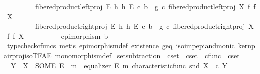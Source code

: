 \begin{isabellebody}
\ \ \ \ \ \ \ \ \ fibered{\isacharunderscore}{\kern0pt}product{\isacharunderscore}{\kern0pt}left{\isacharunderscore}{\kern0pt}proj\ E\ h\ h\ E\ {\isasymcirc}\isactrlsub c\ b\ {\isacharequal}{\kern0pt}\ g\ {\isasymcirc}\isactrlsub c\ fibered{\isacharunderscore}{\kern0pt}product{\isacharunderscore}{\kern0pt}left{\isacharunderscore}{\kern0pt}proj\ X\ f\ f\ X\ {\isasymand}\isanewline
\ \ \ \ \ \ \ \ \ fibered{\isacharunderscore}{\kern0pt}product{\isacharunderscore}{\kern0pt}right{\isacharunderscore}{\kern0pt}proj\ E\ h\ h\ E\ {\isasymcirc}\isactrlsub c\ b\ {\isacharequal}{\kern0pt}\ g\ {\isasymcirc}\isactrlsub c\ fibered{\isacharunderscore}{\kern0pt}product{\isacharunderscore}{\kern0pt}right{\isacharunderscore}{\kern0pt}proj\ X\ f\ f\ X\ {\isasymand}\isanewline
\ \ \ \ \ \ \ \ \ epimorphism\ b{\isachardoublequoteclose}\isanewline
\ \ \ \ \isamarkupfalse%
\ {\isacharparenleft}{\kern0pt}typecheck{\isacharunderscore}{\kern0pt}cfuncs{\isacharcomma}{\kern0pt}\ metis\ epimorphism{\isacharunderscore}{\kern0pt}def{}\ existence\ g{\isacharunderscore}{\kern0pt}eq\ iso{\isacharunderscore}{\kern0pt}imp{\isacharunderscore}{\kern0pt}epi{\isacharunderscore}{\kern0pt}and{\isacharunderscore}{\kern0pt}monic\ kern{\isacharunderscore}{\kern0pt}pair{\isacharunderscore}{\kern0pt}proj{\isacharunderscore}{\kern0pt}iso{\isacharunderscore}{\kern0pt}TFAE{}\ monomorphism{\isacharunderscore}{\kern0pt}def{}{\isacharparenright}{\kern0pt}\isanewline
{}\isamarkupfalse%
%
\endisatagproof
{\isafoldproof}%
%
\isadelimproof
%
\endisadelimproof
%
\isadelimdocument
%
\endisadelimdocument
%
\isatagdocument
%
\isamarkuptrue%
%
\endisatagdocument
{\isafolddocument}%
%
\isadelimdocument
%
\endisadelimdocument
{}\isamarkupfalse%
\ set{\isacharunderscore}{\kern0pt}subtraction\ {\isacharcolon}{\kern0pt}{\isacharcolon}{\kern0pt}\ {\isachardoublequoteopen}cset\ {\isasymRightarrow}\ cset\ {\isasymtimes}\ cfunc\ {\isasymRightarrow}\ cset{\isachardoublequoteclose}\ {\isacharparenleft}{\kern0pt}\ {\isachardoublequoteopen}{\isasymsetminus}{\isachardoublequoteclose}\ {}{}{\isacharparenright}{\kern0pt}\ \isanewline
\ \ {\isachardoublequoteopen}Y\ {\isasymsetminus}\ X\ {\isacharequal}{\kern0pt}\ {\isacharparenleft}{\kern0pt}SOME\ E{\isachardot}{\kern0pt}\ {\isasymexists}\ m{\isacharprime}{\kern0pt}{\isachardot}{\kern0pt}\ \ equalizer\ E\ m{\isacharprime}{\kern0pt}\ {\isacharparenleft}{\kern0pt}characteristic{\isacharunderscore}{\kern0pt}func\ {\isacharparenleft}{\kern0pt}snd\ X{\isacharparenright}{\kern0pt}{\isacharparenright}{\kern0pt}\ {\isacharparenleft}{\kern0pt}{\isasymf}\ {\isasymcirc}\isactrlsub c\ {\isasymbeta}\isactrlbsub Y\isactrlesub {\isacharparenright}{\kern0pt}{\isacharparenright}{\kern0pt}{\isachardoublequoteclose}\isanewline

\end{isabellebody}
